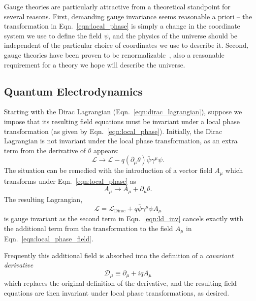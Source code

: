Gauge theories are particularly attractive from a theoretical standpoint for several reasons.
First, demanding gauge invariance seems reasonable a priori -- the transformation in Eqn.~\ref{eqn:local_phase} is simply a change in the coordinate system we use to define the field $\psi$, and the physics of the universe should be independent of the particular choice of coordinates we use to describe it.
Second, gauge theories have been proven to be renormalizable~\cite{tHooft:1971qjg}, also a reasonable requirement for a theory we hope will describe the universe.

\subsection{Quantum Electrodynamics} \label{sec:theory_qed}
Starting with the Dirac Lagrangian (Eqn.~\ref{eqn:dirac_lagrangian}), suppose we impose that its resulting field equations must be invariant under a local phase transformation (as given by Eqn.~\ref{eqn:local_phase}).
Initially, the Dirac Lagrangian is not invariant under the local phase transformation, as an extra term from the derivative of $\theta$ appears:
\begin{equation} \label{eqn:ld_var}
    \mathcal L \to \mathcal L - q (\partial_\mu \theta)\bar{\psi} \gamma^\mu \psi.
\end{equation}
The situation can be remedied with the introduction of a vector field $A_\mu$ which transforms under Eqn.~\ref{eqn:local_phase} as
\begin{equation} \label{eqn:local_phase_field}
    A_\mu \to A_\mu + \partial_\mu \theta.
\end{equation}
The resulting Lagrangian,
\begin{equation} \label{eqn:ld_inv}
    \mathcal L = \mathcal L_{\text{Dirac}} + q \bar{\psi} \gamma^\mu \psi A_\mu
\end{equation}
is gauge invariant as the second term in Eqn.~\ref{eqn:ld_inv} cancels exactly with the additional term from the transformation to the field $A_\mu$ in Eqn.~\ref{eqn:local_phase_field}.

Frequently this additional field is absorbed into the definition of a \emph{covariant derivative} 
\begin{equation}
    \mathcal D_\mu \equiv \partial_\mu + i q A_\mu
\end{equation}
which replaces the original definition of the derivative, and the resulting field equations are then invariant under local phase transformations, as desired.

